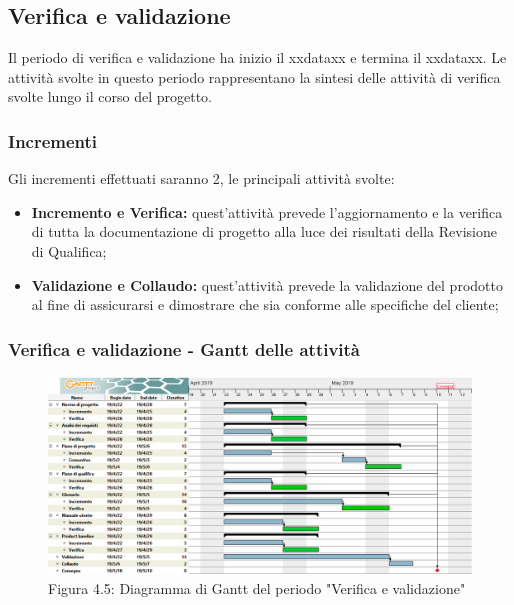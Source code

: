 \subsection{Verifica e validazione}
Il periodo di verifica e validazione ha inizio il xxdataxx e termina il xxdataxx.
Le attività svolte in questo periodo rappresentano la sintesi delle attività di verifica svolte lungo il corso del progetto.

\subsubsection{Incrementi}
Gli incrementi effettuati saranno 2, le principali attività svolte:
\begin{itemize}

	\item \textbf{Incremento e Verifica:} quest'attività prevede l'aggiornamento e la verifica di tutta la documentazione di progetto alla luce dei risultati della Revisione di Qualifica;

	\item \textbf{Validazione e Collaudo:} quest'attività prevede la validazione del prodotto al fine di assicurarsi e dimostrare che sia conforme alle specifiche del cliente;

\end{itemize}
 
 \subsubsection{Verifica e validazione - Gantt delle attività}

\begin{figure} [H]
	\centering
	\includegraphics[scale=0.35]{Res/Gantt/Validazione}
	\caption{Figura 4.5: Diagramma di Gantt del periodo "Verifica e validazione"}\label{}
\end{figure}

 
\pagebreak

